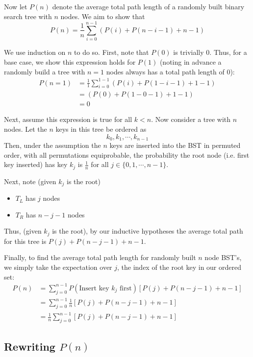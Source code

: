 \documentclass[paper=a4, fontsize=11pt]{scrartcl} %
\numberwithin{equation}{section} %
\numberwithin{figure}{section} %
\numberwithin{table}{section} %
\begin{document}
Now let $P(n)$ denote the average total path length of a randomly built binary search tree with $n$ nodes. We aim to show that
\[P(n) = \frac{1}{n} \sum_{i = 0}^{n-1} \left(P(i) + P(n - i -1) + n - 1\right)\]

We use induction on $n$ to do so. First, note that $P(0)$ is trivially $0$. Thus, for a base case, we show this expression holds for $P(1)$ (noting in advance a randomly build a tree with $n = 1$ nodes always has a total path length of $0$):
\begin{align*}
P(n = 1) &= \frac{1}{1} \sum_{i = 0}^{1-1} \left(P(i) + P(1 - i -1) + 1 - 1\right) \\
 	&= \left(P(0) + P(1 - 0 -1) + 1 - 1\right) \\
	&= 0
\end{align*}

Next, assume this expression is true for all $k < n$. Now consider a tree with $n$ nodes. Let the $n$ keys in this tree be ordered as
\[k_0, k_1, \cdots, k_{n-1}\]
Then, under the assumption the $n$ keys are inserted into the BST in permuted order, with all permutations equiprobable, the probability the root node (i.e. first key inserted) has key $k_j$ is $\frac{1}{n}$ for all $j \in \{0, 1, \cdots, n-1\}$.

Next, note (given $k_j$  is the root)
\begin{itemize}
\item $T_L$ has $j$ nodes
\item $T_R$ has $n - j - 1$ nodes
\end{itemize}

Thus, (given $k_j$  is the root), by our inductive hypotheses the average total path for this tree is $P(j) + P(n - j -1) + n - 1$.

Finally, to find the average total path length for randomly built $n$ node BST's, we simply take the expectation over $j$, the index of the root key in our ordered set:
\begin{align*}
P(n) &= \sum_{j = 0}^{n-1} P(\textrm{Insert key } k_j \textrm{ first})\left[P(j) + P(n - j -1) + n - 1\right] \\
	&= \sum_{j = 0}^{n-1} \frac{1}{n}\left[P(j) + P(n - j -1) + n - 1\right] \\
	&= \frac{1}{n} \sum_{j = 0}^{n-1} \left[P(j) + P(n - j -1) + n - 1\right]
\end{align*}

\subsection{Rewriting $P(n)$}
\end{document}
